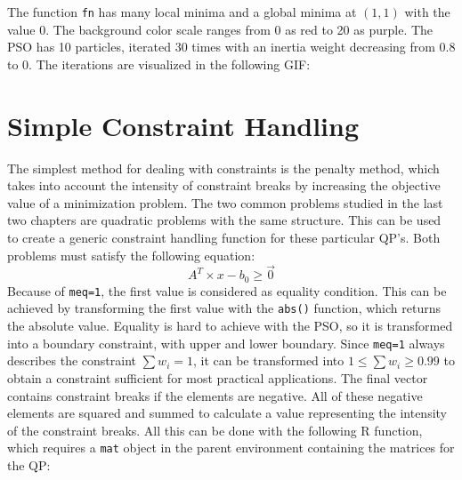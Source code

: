 \documentclass[
  oneside]{book}
\newenvironment{Shaded}{\begin{snugshade}}{\end{snugshade}}
\newcommand{\ControlFlowTok}[1]{\textcolor[rgb]{0.13,0.29,0.53}{\textbf{#1}}}
\newcommand{\DecValTok}[1]{\textcolor[rgb]{0.00,0.00,0.81}{#1}}
\newcommand{\FloatTok}[1]{\textcolor[rgb]{0.00,0.00,0.81}{#1}}
\newcommand{\FunctionTok}[1]{\textcolor[rgb]{0.00,0.00,0.00}{#1}}
\newcommand{\NormalTok}[1]{#1}
\newcommand{\OtherTok}[1]{\textcolor[rgb]{0.56,0.35,0.01}{#1}}
\newcommand{\SpecialCharTok}[1]{\textcolor[rgb]{0.00,0.00,0.00}{#1}}
\begin{document}
The function \texttt{fn} has many local minima and a global minima at \((1,1)\) with the value \(0\). The background color scale ranges from 0 as red to 20 as purple. The PSO has 10 particles, iterated 30 times with an inertia weight decreasing from 0.8 to 0. The iterations are visualized in the following GIF:

\begin{center}
\end{center}

\hypertarget{simple-constraint-handling}{%
\section{Simple Constraint Handling}\label{simple-constraint-handling}}

The simplest method for dealing with constraints is the penalty method, which takes into account the intensity of constraint breaks by increasing the objective value of a minimization problem. The two common problems studied in the last two chapters are quadratic problems with the same structure. This can be used to create a generic constraint handling function for these particular QP's. Both problems must satisfy the following equation:
\[
  A^T \times x - b_0 \geq \vec{0}
\]
Because of \texttt{meq=1}, the first value is considered as equality condition. This can be achieved by transforming the first value with the \texttt{abs()} function, which returns the absolute value. Equality is hard to achieve with the PSO, so it is transformed into a boundary constraint, with upper and lower boundary. Since \texttt{meq=1} always describes the constraint \(\sum w_i = 1\), it can be transformed into \(1 \leq \textstyle\sum w_i \geq 0.99\) to obtain a constraint sufficient for most practical applications. The final vector contains constraint breaks if the elements are negative. All of these negative elements are squared and summed to calculate a value representing the intensity of the constraint breaks. All this can be done with the following R function, which requires a \texttt{mat} object in the parent environment containing the matrices for the QP:

\begin{Shaded}
\end{Shaded}
\end{document}
